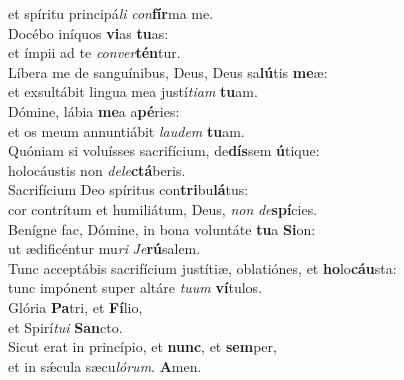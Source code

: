 \oddverse et spíritu principá\textit{li} \textit{con}\textbf{fír}ma me.\\
\evenverse Docébo iníquos \textbf{vi}as \textbf{tu}as:~\*\\
\evenverse et ímpii ad te \textit{con}\textit{ver}\textbf{tén}tur.\\
\oddverse Líbera me de sanguínibus, Deus, Deus sa\textbf{lú}tis \textbf{me}æ:~\*\\
\oddverse et exsultábit lingua mea justí\textit{ti}\textit{am} \textbf{tu}am.\\
\evenverse Dómine, lábia \textbf{me}a a\textbf{pé}ries:~\*\\
\evenverse et os meum annuntiábit \textit{lau}\textit{dem} \textbf{tu}am.\\
\oddverse Quóniam si voluísses sacrifícium, de\textbf{dís}sem \textbf{ú}tique:~\*\\
\oddverse holocáustis non \textit{de}\textit{le}\textbf{ctá}beris.\\
\evenverse Sacrifícium Deo spíritus con\textbf{tri}bu\textbf{lá}tus:~\*\\
\evenverse cor contrítum et humiliátum, Deus, \textit{non} \textit{de}\textbf{spí}cies.\\
\oddverse Benígne fac, Dómine, in bona voluntáte \textbf{tu}a \textbf{Si}on:~\*\\
\oddverse ut ædificéntur mu\textit{ri} \textit{Je}\textbf{rú}salem.\\
\evenverse Tunc acceptábis sacrifícium justítiæ, oblatiónes, et \textbf{ho}lo\textbf{cáu}sta:~\*\\
\evenverse tunc impónent super altáre \textit{tu}\textit{um} \textbf{ví}tulos.\\
\oddverse Glória \textbf{Pa}tri, et \textbf{Fí}lio,~\*\\
\oddverse et Spirí\textit{tu}\textit{i} \textbf{San}cto.\\
\evenverse Sicut erat in princípio, et \textbf{nunc}, et \textbf{sem}per,~\*\\
\evenverse et in sǽcula sæcu\textit{ló}\textit{rum}. \textbf{A}men.\\
